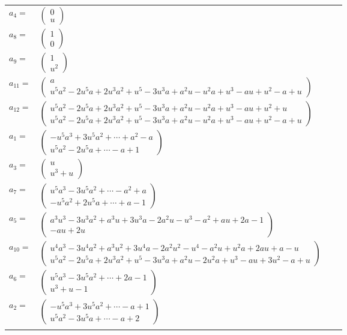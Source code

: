 \documentclass[1p]{elsarticle_modified}
\theoremstyle{definition}
\begin{document}
\begin{tabular}{m{7pt} m{180pt} m{7pt} m{180pt} }
\flushright $a_{4}=$&$\begin{pmatrix}0\\u\end{pmatrix}$ \\
\flushright $a_{8}=$&$\begin{pmatrix}1\\0\end{pmatrix}$ \\
\flushright $a_{9}=$&$\begin{pmatrix}1\\u^2\end{pmatrix}$ \\
\flushright $a_{11}=$&$\begin{pmatrix}a\\u^5 a^2-2 u^5 a+2 u^3 a^2+u^5-3 u^3 a+a^2 u- u^2 a+u^3- a u+u^2- a+u\end{pmatrix}$ \\
\flushright $a_{12}=$&$\begin{pmatrix}u^5 a^2-2 u^5 a+2 u^3 a^2+u^5-3 u^3 a+a^2 u- u^2 a+u^3- a u+u^2+u\\u^5 a^2-2 u^5 a+2 u^3 a^2+u^5-3 u^3 a+a^2 u- u^2 a+u^3- a u+u^2- a+u\end{pmatrix}$ \\
\flushright $a_{1}=$&$\begin{pmatrix}- u^5 a^3+3 u^5 a^2+\cdots+a^2- a\\u^5 a^2-2 u^5 a+\cdots- a+1\end{pmatrix}$ \\
\flushright $a_{3}=$&$\begin{pmatrix}u\\u^3+u\end{pmatrix}$ \\
\flushright $a_{7}=$&$\begin{pmatrix}u^5 a^3-3 u^5 a^2+\cdots- a^2+a\\- u^5 a^2+2 u^5 a+\cdots+a-1\end{pmatrix}$ \\
\flushright $a_{5}=$&$\begin{pmatrix}a^3 u^3-3 u^3 a^2+a^3 u+3 u^3 a-2 a^2 u- u^3- a^2+a u+2 a-1\\- a u+2 u\end{pmatrix}$ \\
\flushright $a_{10}=$&$\begin{pmatrix}u^4 a^3-3 u^4 a^2+a^3 u^2+3 u^4 a-2 a^2 u^2- u^4- a^2 u+u^2 a+2 a u+a- u\\u^5 a^2-2 u^5 a+2 u^3 a^2+u^5-3 u^3 a+a^2 u-2 u^2 a+u^3- a u+3 u^2- a+u\end{pmatrix}$ \\
\flushright $a_{6}=$&$\begin{pmatrix}u^5 a^3-3 u^5 a^2+\cdots+2 a-1\\u^3+u-1\end{pmatrix}$ \\
\flushright $a_{2}=$&$\begin{pmatrix}- u^5 a^3+3 u^5 a^2+\cdots- a+1\\u^5 a^2-3 u^5 a+\cdots- a+2\end{pmatrix}$\\&\end{tabular}
\end{document}
